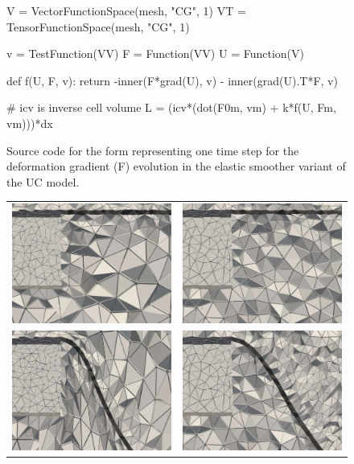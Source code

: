 \begin{figure}
\begin{python}
V = VectorFunctionSpace(mesh, "CG", 1)
VT = TensorFunctionSpace(mesh, "CG", 1)

v = TestFunction(VV)
F = Function(VV)
U = Function(V)

def f(U, F, v):
    return -inner(F*grad(U), v) - inner(grad(U).T*F, v)

# icv is inverse cell volume
L = (icv*(dot(F0m, vm) + k*f(U, Fm, vm)))*dx
\end{python}
\caption{Source code for the form representing one time step for the
deformation gradient (F) evolution in the elastic smoother variant of
the UC model.}
\label{code:FFC_ElasticSmoother}
\end{figure}

\begin{figure}
\begin{center}
\begin{tabular}{cc}
\includegraphics[height=0.24\linewidth]{chapters/hoffman-2/pdf/force_smooth01.pdf} &
\includegraphics[height=0.24\linewidth]{chapters/hoffman-2/pdf/force_hybrid01.pdf}\\
\includegraphics[height=0.24\linewidth]{chapters/hoffman-2/pdf/force_smooth02.pdf} &
\includegraphics[height=0.24\linewidth]{chapters/hoffman-2/pdf/force_hybrid02.pdf}\\

\end{tabular}
\end{center}
\end{figure}
